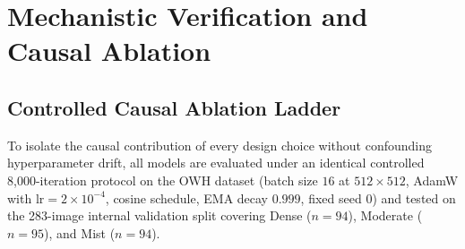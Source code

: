 \documentclass[journal,twoside]{IEEEtran}
\begin{document}
\begin{table}[t]
\centering
\caption{Native Structural Partition of MaritimeSFNet for Onboard Deployment and Downstream Real-Sea-Fog LoRA Adaptation}
\label{tab:lora_groups}
\renewcommand{\arraystretch}{1.15}
\setlength{\tabcolsep}{3.5pt}
\end{table}

\section{Mechanistic Verification and Causal Ablation}
\label{sec:experiments}

\subsection{Controlled Causal Ablation Ladder}
\label{sec:ablation}

To isolate the causal contribution of every design choice without confounding hyperparameter drift, all models are evaluated under an identical controlled 8,000-iteration protocol on the OWH dataset (batch size $16$ at $512\times 512$, AdamW with $\mathrm{lr}=2\times 10^{-4}$, cosine schedule, EMA decay $0.999$, fixed seed $0$) and tested on the 283-image internal validation split covering Dense ($n=94$), Moderate ($n=95$), and Mist ($n=94$).
\end{document}

